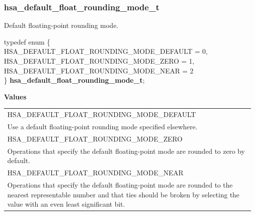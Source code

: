 \documentclass[final,oneside]{book}
\newcommand{\reftyp}[1]{#1}
\newcommand{\refenu}[1]{\reftyp{#1}}
\newenvironment{mylongtable}{\rowcolors{0}{lightgray}{lightgray}\longtable} {
\endlongtable}
\begin{document}
\subsubsection{hsa_\-default_\-float_\-rounding_\-mode_\-t}
\vspace{-2.5mm}Default floating-point rounding mode.\begin{mylongtable}{@{}p{\textwidth}}
\rule{0pt}{3ex}typedef enum \{\\\hspace{1.7em}\hypertarget{group__agentinfo_1ggaac56321e4596fe10a90b5bb3fedc4b73a51bef81c634ce06d57f57a6622051f96}{\refenu{HSA_\-DEFAULT_\-FLOAT_\-ROUNDING_\-MODE_\-DEFAULT}} = 0,\\
\hspace{1.7em}\hypertarget{group__agentinfo_1ggaac56321e4596fe10a90b5bb3fedc4b73a728ca37667c6479e2e397cfcf3795a02}{\refenu{HSA_\-DEFAULT_\-FLOAT_\-ROUNDING_\-MODE_\-ZERO}} = 1,\\
\hspace{1.7em}\hypertarget{group__agentinfo_1ggaac56321e4596fe10a90b5bb3fedc4b73a4bc4d1ee70e140a1820755762bf4186c}{\refenu{HSA_\-DEFAULT_\-FLOAT_\-ROUNDING_\-MODE_\-NEAR}} = 2\\
\} \hypertarget{group__agentinfo_1gaac56321e4596fe10a90b5bb3fedc4b73}{\textbf{hsa_\-default_\-float_\-rounding_\-mode_\-t}};\rule[-2ex]{0pt}{0pt}\end{mylongtable}\noindent\textbf{Values}\\[-7mm]
\begin{longtable}{@{\hspace{2em}}p{\linewidth-2em}}
\hspace{-2em}\refenu{HSA_\-DEFAULT_\-FLOAT_\-ROUNDING_\-MODE_\-DEFAULT}\\Use a default floating-point rounding mode specified elsewhere.\\[2mm]
\hspace{-2em}\refenu{HSA_\-DEFAULT_\-FLOAT_\-ROUNDING_\-MODE_\-ZERO}\\Operations that specify the default floating-point mode are rounded to zero by default.\\[2mm]
\hspace{-2em}\refenu{HSA_\-DEFAULT_\-FLOAT_\-ROUNDING_\-MODE_\-NEAR}\\Operations that specify the default floating-point mode are rounded to the nearest representable number and that ties should be broken by selecting the value with an even least significant bit.
\end{longtable}
\end{document}
